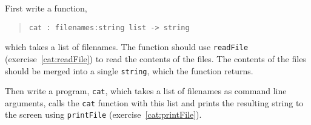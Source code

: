First write a function,
\begin{quote}
  \mbox{\lstinline!cat : filenames:string list -> string!}
\end{quote}
which takes a list of filenames. The function should use
\lstinline{readFile} (exercise~\ref{cat:readFile}) to read the
contents of the files. The contents of the files should be merged into
a single \lstinline{string}, which the function returns.

Then write a program, \lstinline[language=console]{cat}, which takes a
list of filenames as command line arguments, calls the \lstinline{cat}
function with this list and prints the resulting string to the screen
using \lstinline{printFile} (exercise~\ref{cat:printFile}).
